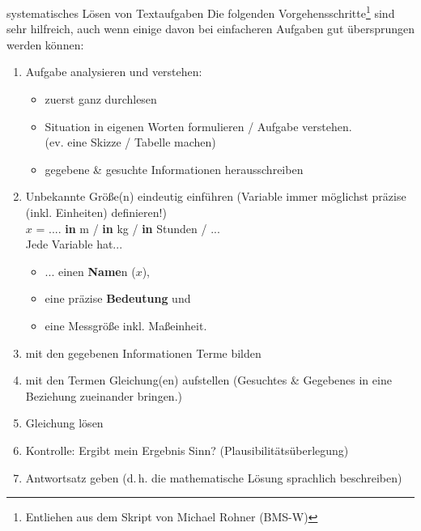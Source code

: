 \begin{rezept}{systematisches Lösen von Textaufgaben}{}
Die folgenden Vorgehensschritte\footnote{Entliehen aus dem Skript von Michael
  Rohner (BMS-W)} sind sehr hilfreich, auch wenn einige davon bei
  einfacheren Aufgaben gut übersprungen werden können:

\begin{enumerate}\label{textaufgaben_verfahren_in_sieben_schritten}
\item Aufgabe analysieren und verstehen:
  \begin{itemize}
  \item zuerst ganz durchlesen
  \item Situation in eigenen Worten formulieren / Aufgabe verstehen.\\
    (ev. eine Skizze / Tabelle machen)
  \item gegebene \& gesuchte Informationen herausschreiben
  \end {itemize}
  
\item Unbekannte Größe(n) eindeutig einführen
  (Variable immer möglichst präzise (inkl. Einheiten) definieren!)
  \\
  $x$ = .... \textbf{in} m / \textbf{in} kg / \textbf{in} Stunden  /
  ...
  \\
  Jede Variable hat...
  \begin{itemize}
  \item ... einen \textbf{Name}n (\zB $x$),
  \item eine präzise \textbf{Bedeutung} und
  \item eine Messgröße inkl. Maßeinheit.
  \end{itemize}
  
\item mit den gegebenen Informationen Terme bilden
  
\item mit den Termen Gleichung(en) aufstellen
  (Gesuchtes \& Gegebenes in eine Beziehung zueinander bringen.)

\item Gleichung lösen

\item Kontrolle: Ergibt mein Ergebnis Sinn? (Plausibilitätsüberlegung)

\item  Antwortsatz geben (d.\,h. die mathematische Lösung sprachlich
    beschreiben)
    
\end{enumerate}    
\end{rezept}


